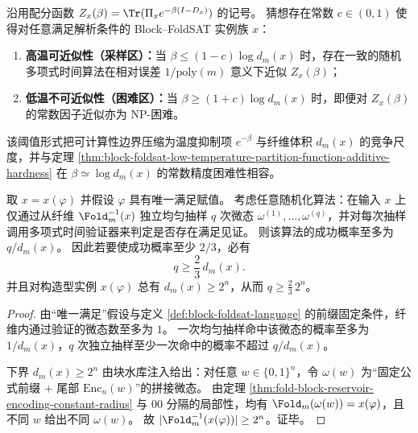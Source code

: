 \begin{conjecture}\label{conj:block-foldsat-computational-temperature-threshold}
沿用配分函数 \(Z_x(\beta)=\Tr(\Pi_x e^{-\beta(I-D_x)})\) 的记号。
猜想存在常数 \(c\in(0,1)\) 使得对任意满足解析条件的 Block--FoldSAT 实例族 \(x\)：
\begin{enumerate}
\normalfont
  \item \textbf{高温可近似性（采样区）：}当 \(\beta\le (1-c)\log d_m(x)\) 时，存在一致的随机多项式时间算法在相对误差 \(1/\mathrm{poly}(m)\) 意义下近似 \(Z_x(\beta)\)；
  \item \textbf{低温不可近似性（困难区）：}当 \(\beta\ge (1+c)\log d_m(x)\) 时，即便对 \(Z_x(\beta)\) 的常数因子近似亦为 NP-困难。
\end{enumerate}
该阈值形式把可计算性边界压缩为温度抑制项 \(e^{-\beta}\) 与纤维体积 \(d_m(x)\) 的竞争尺度，并与定理 \ref{thm:block-foldsat-low-temperature-partition-function-additive-hardness} 在 \(\beta\simeq \log d_m(x)\) 的常数精度困难性相容。
\end{conjecture}

\begin{proposition}\label{prop:block-foldsat-uniform-sampling-exp-lb}
取 \(x=x(\varphi)\) 并假设 \(\varphi\) 具有唯一满足赋值。
考虑任意随机化算法：在输入 \(x\) 上仅通过从纤维 \(\Fold_m^{-1}(x)\) 独立均匀抽样 \(q\) 次微态 \(\omega^{(1)},\dots,\omega^{(q)}\)，并对每次抽样调用多项式时间验证器来判定是否存在满足见证。
则该算法的成功概率至多为 \(q/d_m(x)\)。
因此若要使成功概率至少 \(2/3\)，必有
\[
q\ge \frac23\,d_m(x).
\]
并且对构造型实例 \(x(\varphi)\) 总有 \(d_m(x)\ge 2^{n}\)，从而 \(q\ge \frac23\,2^{n}\)。
\end{proposition}

\begin{proof}
由“唯一满足”假设与定义 \ref{def:block-foldsat-language} 的前缀固定条件，纤维内通过验证的微态数至多为 \(1\)。
一次均匀抽样命中该微态的概率至多为 \(1/d_m(x)\)，\(q\) 次独立抽样至少一次命中的概率不超过 \(q/d_m(x)\)。
\par
下界 \(d_m(x)\ge 2^{n}\) 由块水库注入给出：对任意 \(w\in\{0,1\}^n\)，令
\(\omega(w)\) 为“固定公式前缀 + 尾部 \(\mathrm{Enc}_n(w)\)”的拼接微态。
由定理 \ref{thm:fold-block-reservoir-encoding-constant-radius} 与 \(00\) 分隔的局部性，均有 \(\Fold_m(\omega(w))=x(\varphi)\)，且不同 \(w\) 给出不同 \(\omega(w)\)。
故 \(|\Fold_m^{-1}(x(\varphi))|\ge 2^n\)。证毕。
\end{proof}

